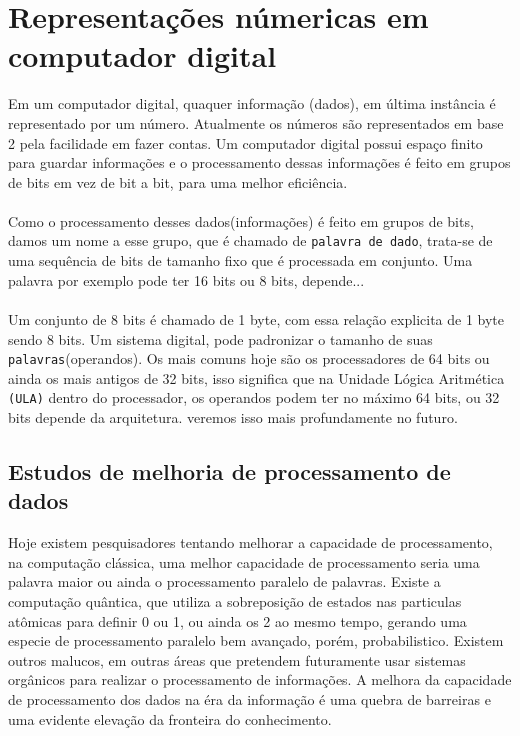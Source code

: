 \documentclass[12pt, onecolumn]{article}
\begin{document}
		\section{\centering Representações númericas em computador digital}
	
	Em um computador digital, quaquer informação (dados), em última instância
	é representado por um número. Atualmente os números são representados em base 2
	pela facilidade em fazer contas. Um computador digital possui espaço finito
	para guardar informações e o processamento dessas informações é feito em grupos
	de bits em vez de bit a bit, para uma melhor eficiência.\\
	\\
	Como o processamento desses dados(informações) é feito em grupos de bits, damos
	um nome a esse grupo, que é chamado de \texttt{palavra de dado}, trata-se de uma
	sequência de bits de tamanho fixo que é processada em conjunto. Uma palavra
	por exemplo pode ter 16 bits ou 8 bits, depende...\\
	\\
	Um conjunto de 8 bits é chamado de 1 byte, com essa relação explicita de 
	1 byte sendo 8 bits. Um sistema digital, pode padronizar o tamanho de suas 
	\texttt{palavras}(operandos). Os mais comuns hoje são os processadores de 
	64 bits	ou ainda os mais antigos de 32 bits, isso significa que na 
	Unidade Lógica Aritmética \texttt{(ULA)} dentro do processador, 
	os operandos podem ter no máximo 64 bits, ou 32 bits depende da arquitetura. 
	veremos isso mais profundamente no futuro.\\

		\subsection{\centering Estudos de melhoria de processamento de dados}
	
	Hoje existem pesquisadores tentando melhorar a capacidade de processamento, 
	na computação clássica, uma melhor capacidade de processamento seria uma palavra
	maior ou ainda o processamento paralelo de palavras. Existe a computação
	quântica, que utiliza a sobreposição de estados nas particulas atômicas para
	definir 0 ou 1, ou ainda os 2 ao mesmo tempo, gerando uma especie de 
	processamento paralelo bem avançado, porém, probabilistico. 
	Existem outros malucos, em outras áreas que pretendem futuramente 
	usar sistemas orgânicos para realizar o processamento de informações. 
	A melhora da capacidade de processamento dos dados na éra da informação 
	é uma quebra de barreiras e uma evidente elevação da fronteira do conhecimento.
	\\
\end{document}
